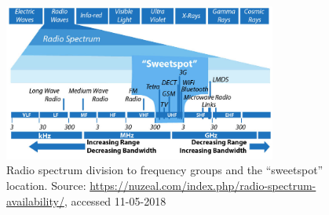 \begin{figure}
    \centering
    \includegraphics[width=0.8\textwidth]{00images/radio-spectrum-3}
    \caption{Radio spectrum division to frequency groups and the ``sweetspot'' location. Source: \url{https://nuzeal.com/index.php/radio-spectrum-availability/}, accessed 11-05-2018}
    \label{fig:radio-spectrum}
\end{figure}{}
% 
% 
    
